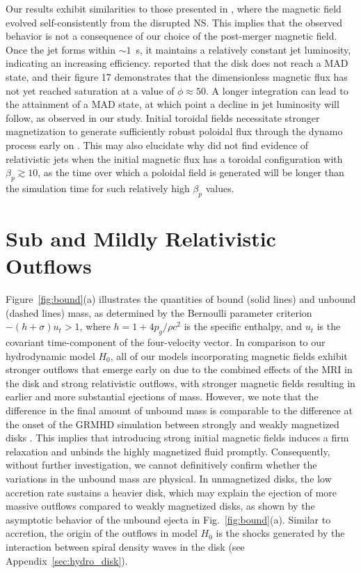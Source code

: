 \documentclass[twocolumn,dvipsnames]{aastex62}
\begin{document}
Our results exhibit similarities to those presented in \citet{Hayashi2022a,Hayashi2023}, where the magnetic field evolved self-consistently from the disrupted NS. This implies that the observed behavior is not a consequence of our choice of the post-merger magnetic field. Once the jet forms within $ \sim 1 $~s, it maintains a relatively constant jet luminosity, indicating an increasing efficiency. \citet{Hayashi2023} reported that the disk does not reach a MAD state, and their figure 17 demonstrates that the dimensionless magnetic flux has not yet reached saturation at a value of $ \phi \approx 50 $. A longer integration can lead to the attainment of a MAD state, at which point a decline in jet luminosity will follow, as observed in our study. Initial toroidal fields necessitate stronger magnetization to generate sufficiently robust poloidal flux through the dynamo process early on \citep{Christie2019}. This may also elucidate why \citet{Ruiz2018,Most2021,Gottlieb2022d} did not find evidence of relativistic jets when the initial magnetic flux has a toroidal configuration with $ \beta_p \gtrsim 10 $, as the time over which a poloidal field is generated will be longer than the simulation time for such relatively high $ \beta_p $ values.
 
\section{Sub and Mildly Relativistic Outflows}\label{sec:ejecta}

Figure~\ref{fig:bound}(a) illustrates the quantities of bound (solid lines) and unbound (dashed lines) mass, as determined by the Bernoulli parameter criterion $ -(h+\sigma)u_t>1 $, where $ h = 1+4p_g/ \rho c^2 $ is the specific enthalpy, and $u_t$ is the covariant time-component of the four-velocity vector. In comparison to our hydrodynamic model $H_0$, all of our models incorporating magnetic fields exhibit stronger outflows that emerge early on due to the combined effects of the MRI in the disk and strong relativistic outflows, with stronger magnetic fields resulting in earlier and more substantial ejections of mass. However, we note that the difference in the final amount of unbound mass is comparable to the difference at the onset of the GRMHD simulation between strongly and weakly magnetized disks \citep[see also][]{Hayashi2022a}. This implies that introducing strong initial magnetic fields induces a firm relaxation and unbinds the highly magnetized fluid promptly. Consequently, without further investigation, we cannot definitively confirm whether the variations in the unbound mass are physical. In unmagnetized disks, the low accretion rate sustains a heavier disk, which may explain the ejection of more massive outflows compared to weakly magnetized disks, as shown by the asymptotic behavior of the unbound ejecta in Fig.~\ref{fig:bound}(a). Similar to accretion, the origin of the outflows in model $ H_0 $ is the shocks generated by the interaction between spiral density waves in the disk (see Appendix~\ref{sec:hydro_disk}).
\end{document}
